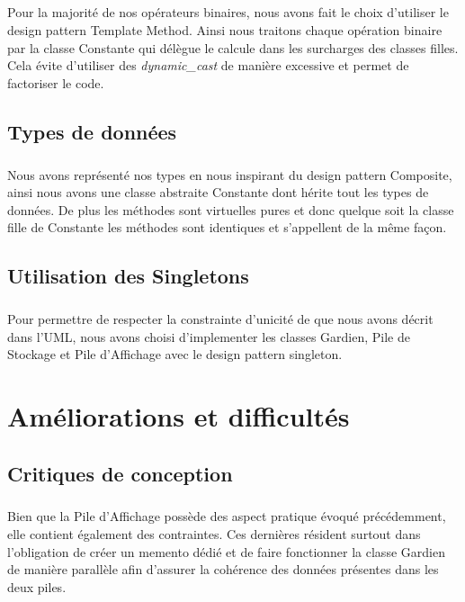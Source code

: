 \documentclass[a4paper,11pt]{report}
\begin{document}
			\paragraph{}Pour la majorité de nos opérateurs binaires, nous avons fait le choix d'utiliser le design pattern Template Method. Ainsi nous traitons chaque opération binaire par la classe Constante qui délègue le calcule dans les surcharges des classes filles. Cela évite d’utiliser des \emph{dynamic\_cast} de manière excessive et permet de factoriser le code.

	\section{Types de données}
		\paragraph{}Nous avons représenté nos types en nous inspirant du design pattern Composite, ainsi nous avons une classe abstraite Constante dont hérite tout les types de données. De plus les méthodes sont virtuelles pures et donc quelque soit la classe fille de Constante les méthodes sont identiques et s'appellent de la même façon.
		
	\section{Utilisation des Singletons}
		\paragraph{}Pour permettre de respecter la constrainte d'unicité de que nous avons décrit dans l'UML, nous avons choisi d'implementer les classes Gardien, Pile de Stockage et Pile d'Affichage avec le design pattern singleton.
		
\chapter{Améliorations et difficultés}

	\section{Critiques de conception}
		\paragraph{}Bien que la Pile d'Affichage possède des aspect pratique évoqué précédemment, elle contient également des contraintes. Ces dernières résident surtout dans l'obligation de créer un memento dédié et de faire fonctionner la classe Gardien de manière parallèle afin d'assurer la cohérence des données présentes dans les deux piles.
		
\end{document}
